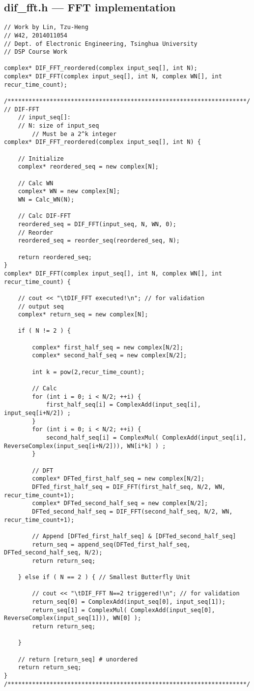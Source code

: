 \subsection{dif\_fft.h --- FFT implementation}\label{code:fft}
\begin{lstlisting}
// Work by Lin, Tzu-Heng
// W42, 2014011054
// Dept. of Electronic Engineering, Tsinghua University
// DSP Course Work

complex* DIF_FFT_reordered(complex input_seq[], int N);
complex* DIF_FFT(complex input_seq[], int N, complex WN[], int recur_time_count);

/********************************************************************/
// DIF-FFT
	// input_seq[]: 
	// N: size of input_seq
		// Must be a 2^k integer
complex* DIF_FFT_reordered(complex input_seq[], int N) {
	
	// Initialize
	complex* reordered_seq = new complex[N];
	
	// Calc WN
	complex* WN = new complex[N];
	WN = Calc_WN(N);

	// Calc DIF-FFT
	reordered_seq = DIF_FFT(input_seq, N, WN, 0);
	// Reorder
	reordered_seq = reorder_seq(reordered_seq, N);

	return reordered_seq;
}
complex* DIF_FFT(complex input_seq[], int N, complex WN[], int recur_time_count) {

	// cout << "\tDIF_FFT executed!\n"; // for validation
	// output seq
	complex* return_seq = new complex[N];

	if ( N != 2 ) {

		complex* first_half_seq = new complex[N/2];
		complex* second_half_seq = new complex[N/2];

		int k = pow(2,recur_time_count);

		// Calc
		for (int i = 0; i < N/2; ++i) {
			first_half_seq[i] = ComplexAdd(input_seq[i], input_seq[i+N/2]) ;
		}
		for (int i = 0; i < N/2; ++i) {
			second_half_seq[i] = ComplexMul( ComplexAdd(input_seq[i], ReverseComplex(input_seq[i+N/2])), WN[i*k] ) ;
		}

		// DFT
		complex* DFTed_first_half_seq = new complex[N/2];
		DFTed_first_half_seq = DIF_FFT(first_half_seq, N/2, WN, recur_time_count+1);
		complex* DFTed_second_half_seq = new complex[N/2];
		DFTed_second_half_seq = DIF_FFT(second_half_seq, N/2, WN, recur_time_count+1);

		// Append [DFTed_first_half_seq] & [DFTed_second_half_seq]
		return_seq = append_seq(DFTed_first_half_seq, DFTed_second_half_seq, N/2);
		return return_seq;

	} else if ( N == 2 ) { // Smallest Butterfly Unit

		// cout << "\tDIF_FFT N==2 triggered!\n"; // for validation
		return_seq[0] = ComplexAdd(input_seq[0], input_seq[1]);
		return_seq[1] = ComplexMul( ComplexAdd(input_seq[0], ReverseComplex(input_seq[1])), WN[0] );
		return return_seq;
	
	}

	// return [return_seq] # unordered
	return return_seq;
}
/********************************************************************/
\end{lstlisting}


